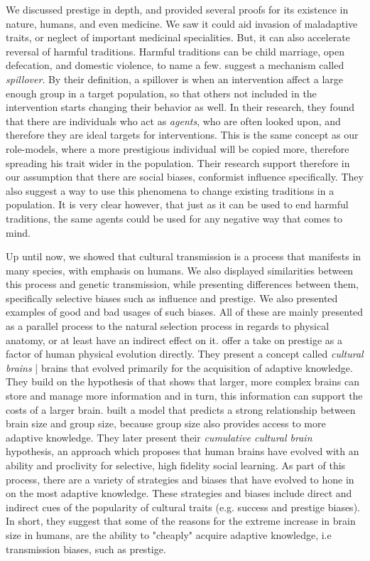 \documentclass[12pt]{extarticle}
\begin{document}
We discussed prestige in depth, and provided several proofs for its existence in nature, humans, and even medicine. We saw it could aid invasion of maladaptive traits, or neglect of important medicinal specialities. But, it can also accelerate reversal of harmful traditions.
Harmful traditions can be child marriage, open defecation, and domestic violence, to name a few. 
\citet{harmful_traditions} suggest a mechanism called \textit{spillover}. By their definition, a spillover is when an intervention affect a large enough group in a target population, so that others not included in the intervention starts changing their behavior as well. In their research, they found that there are individuals who act as \textit{agents}, who are often looked upon, and therefore they are ideal targets for interventions. This is the same concept as our role-models, where a more prestigious individual will be copied more, therefore spreading his trait wider in the population. Their research support therefore in our assumption that there are social biases, conformist influence specifically. They also suggest a way to use this phenomena to change existing traditions in a population. It is very clear however, that just as it can be used to end harmful traditions, the same agents could be used for any negative way that comes to mind.

Up until now, we showed that cultural transmission is a process that manifests in many species, with emphasis on humans. We also displayed similarities between this process and genetic transmission, while presenting differences between them, specifically selective biases such as influence and prestige. We also presented examples of good and bad usages of such biases. All of these are mainly presented as a parallel process to the natural selection process in regards to physical anatomy, or at least have an indirect effect on it. \citet{collective_brains} offer a take on prestige as a factor of human physical evolution directly. They present a concept called \textit{cultural brains} | brains that evolved primarily for the acquisition of adaptive knowledge.
They build on the hypothesis of \citet{social_brains} that shows that larger, more complex brains can store and manage more information and in turn, this information can support the costs of a larger brain.
\citet{collective_brains} built a model that predicts a strong relationship between brain size and group size, because group size also provides access to more adaptive knowledge. They later present their \textit{cumulative cultural brain} hypothesis, an approach which proposes that human brains have evolved with an ability and proclivity for selective, high fidelity social learning. As part of this process, there are a variety of strategies and biases that have evolved to hone in on the most adaptive knowledge. These strategies and biases include direct and indirect cues of the popularity of cultural traits (e.g. success and prestige biases).
In short, they suggest that some of the reasons for the extreme increase in brain size in humans, are the ability to "cheaply" acquire adaptive knowledge, i.e transmission biases, such as prestige.
\end{document}
